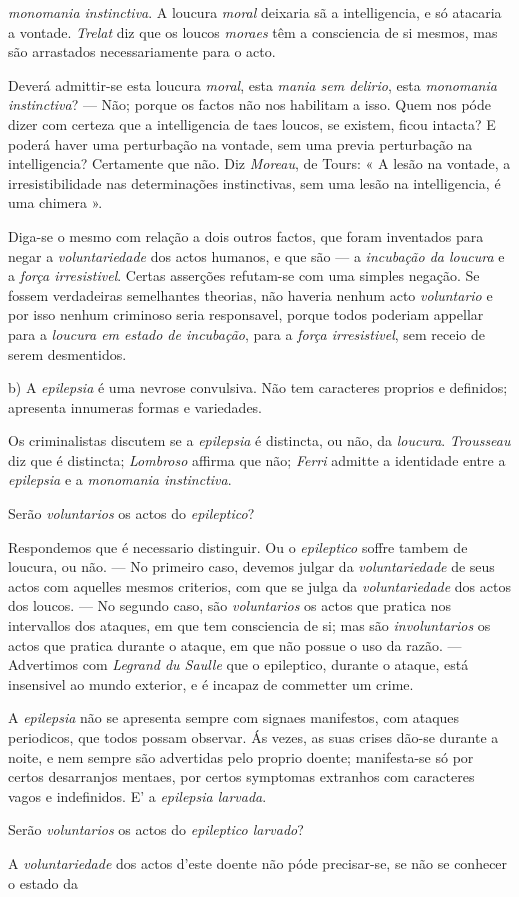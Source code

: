 \emph{monomania instinctiva}. A loucura \emph{moral} deixaria sã a intelligencia, e só atacaria a vontade. \emph{Trelat} diz que os loucos \emph{moraes} têm a consciencia de si mesmos, mas são arrastados necessariamente para o acto.\par Deverá admittir-se esta loucura \emph{moral}, esta \emph{mania sem delirio}, esta \emph{monomania instinctiva}? --- Não; porque os factos não nos habilitam a isso. Quem nos póde dizer com certeza que a intelligencia de taes loucos, se existem, ficou intacta? E poderá haver uma perturbação na vontade, sem uma previa perturbação na intelligencia? Certamente que não. Diz \emph{Moreau}, de Tours: « A lesão na vontade, a irresistibilidade nas determinações instinctivas, sem uma lesão na intelligencia, é uma chimera ».\par Diga-se o mesmo com relação a dois outros factos, que foram inventados para negar a \emph{voluntariedade} dos actos humanos, e que são --- a \emph{incubação da loucura} e a \emph{força irresistivel}. Certas asserções refutam-se com uma simples negação. Se fossem verdadeiras semelhantes theorias, não haveria nenhum acto \emph{voluntario} e por isso nenhum criminoso seria responsavel, porque todos poderiam appellar para a \emph{loucura em estado de incubação}, para a \emph{força irresistivel}, sem receio de serem desmentidos.\par b) A \emph{epilepsia} é uma nevrose convulsiva. Não tem caracteres proprios e definidos; apresenta innumeras formas e variedades.\par Os criminalistas discutem se a \emph{epilepsia} é distincta, ou não, da \emph{loucura}. \emph{Trousseau} diz que é distincta; \emph{Lombroso} affirma que não; \emph{Ferri} admitte a identidade entre a \emph{epilepsia} e a \emph{monomania instinctiva}.\par Serão \emph{voluntarios} os actos do \emph{epileptico}?\par Respondemos que é necessario distinguir. Ou o \emph{epileptico} soffre tambem de loucura, ou não. --- No primeiro caso, devemos julgar da \emph{voluntariedade} de seus actos com aquelles mesmos criterios, com que se julga da \emph{voluntariedade} dos actos dos loucos. --- No segundo caso, são \emph{voluntarios} os actos que pratica nos intervallos dos ataques, em que tem consciencia de si; mas são \emph{involuntarios} os actos que pratica durante o ataque, em que não possue o uso da razão. --- Advertimos com \emph{Legrand du Saulle} que o epileptico, durante o ataque, está insensivel ao mundo exterior, e é incapaz de commetter um crime.\par A \emph{epilepsia} não se apresenta sempre com signaes manifestos, com ataques periodicos, que todos possam observar. Ás vezes, as suas crises dão-se durante a noite, e nem sempre são advertidas pelo proprio doente; manifesta-se só por certos desarranjos mentaes, por certos symptomas extranhos com caracteres vagos e indefinidos. E' a \emph{epilepsia larvada}.\par Serão \emph{voluntarios} os actos do \emph{epileptico larvado}?\par A \emph{voluntariedade} dos actos d'este doente não póde precisar-se, se não se conhecer o estado da 